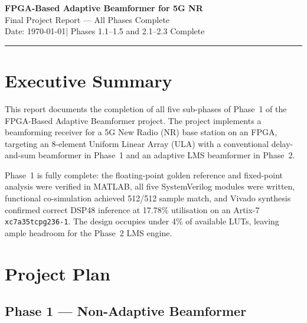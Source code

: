 \documentclass[11pt,a4paper]{article}
\begin{document}
\begin{center}
    {\LARGE\bfseries FPGA-Based Adaptive Beamformer for 5G NR}\\[0.4em]
    {\large Final Project Report --- All Phases Complete}\\[0.3em]
    {\normalsize\color{neutralgray}Date: \today \quad|\quad
     Phases 1.1--1.5 and 2.1--2.3 Complete}
\end{center}

\vspace{0.5em}\hrule\vspace{1em}

\section{Executive Summary}

This report documents the completion of all five sub-phases of Phase~1 of the
FPGA-Based Adaptive Beamformer project. The project implements a beamforming
receiver for a 5G New Radio (NR) base station on an FPGA, targeting an
8-element Uniform Linear Array (ULA) with a conventional delay-and-sum
beamformer in Phase~1 and an adaptive LMS beamformer in Phase~2.

Phase~1 is fully complete: the floating-point golden reference and fixed-point
analysis were verified in MATLAB, all five SystemVerilog modules were written,
functional co-simulation achieved 512/512 sample match, and Vivado synthesis
confirmed correct DSP48 inference at 17.78\% utilisation on an Artix-7
\texttt{xc7a35tcpg236-1}. The design occupies under 4\% of available LUTs,
leaving ample headroom for the Phase~2 LMS engine.

\section{Project Plan}

\subsection{Phase 1 --- Non-Adaptive Beamformer}
\end{document}
